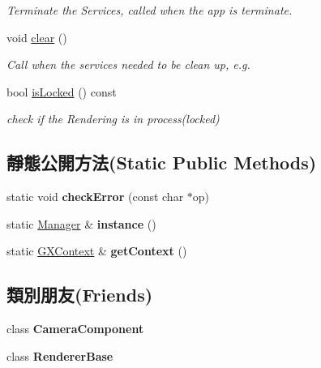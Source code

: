 \begin{DoxyCompactItemize}
\begin{DoxyCompactList}\small\item\em Terminate the Services, called when the app is terminate. \end{DoxyCompactList}\item 
void \hyperlink{class_magnum_1_1_video_1_1_manager_a869cb21e0a94fb7c0a2a3d6b0b4e536e}{clear} ()
\begin{DoxyCompactList}\small\item\em Call when the services needed to be clean up, e.\+g. \end{DoxyCompactList}\item 
bool \hyperlink{class_magnum_1_1_video_1_1_manager_ab3ff834d6364a7fa78fb9176deb09056}{is\+Locked} () const 
\begin{DoxyCompactList}\small\item\em check if the Rendering is in process(locked) \end{DoxyCompactList}\end{DoxyCompactItemize}
\subsection*{靜態公開方法(Static Public Methods)}
\begin{DoxyCompactItemize}
\item 
static void {\bfseries check\+Error} (const char $\ast$op)\hypertarget{class_magnum_1_1_video_1_1_manager_a6215cf06019401ac030bc0f56c6ec5ee}{}\label{class_magnum_1_1_video_1_1_manager_a6215cf06019401ac030bc0f56c6ec5ee}

\item 
static \hyperlink{class_magnum_1_1_video_1_1_manager}{Manager} \& {\bfseries instance} ()\hypertarget{class_magnum_1_1_video_1_1_manager_a85d7ad944649cab481573b3287a26dfe}{}\label{class_magnum_1_1_video_1_1_manager_a85d7ad944649cab481573b3287a26dfe}

\item 
static \hyperlink{class_magnum_1_1_g_x_context}{G\+X\+Context} \& {\bfseries get\+Context} ()\hypertarget{class_magnum_1_1_video_1_1_manager_a657230fb6b985786cc91a2d67ff7306f}{}\label{class_magnum_1_1_video_1_1_manager_a657230fb6b985786cc91a2d67ff7306f}

\end{DoxyCompactItemize}
\subsection*{類別朋友(Friends)}
\begin{DoxyCompactItemize}
\item 
class {\bfseries Camera\+Component}\hypertarget{class_magnum_1_1_video_1_1_manager_ae834a5e62eff7d0adb1092a0693388f7}{}\label{class_magnum_1_1_video_1_1_manager_ae834a5e62eff7d0adb1092a0693388f7}

\item 
class {\bfseries Renderer\+Base}\hypertarget{class_magnum_1_1_video_1_1_manager_a3be435fc6104d4d670e10e39be9bdf2a}{}\label{class_magnum_1_1_video_1_1_manager_a3be435fc6104d4d670e10e39be9bdf2a}

\end{DoxyCompactItemize}


